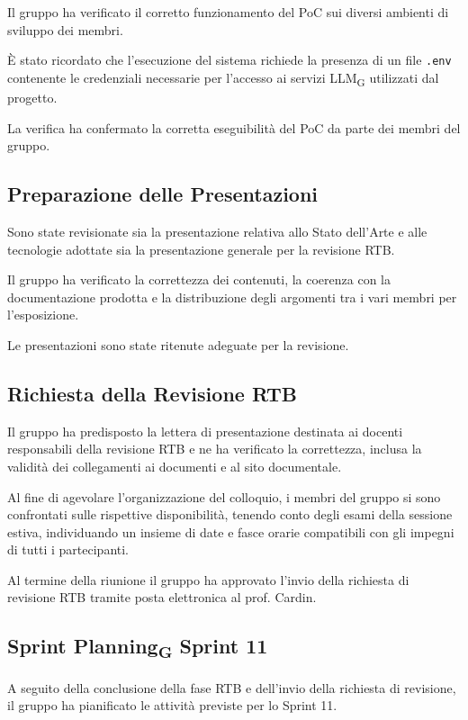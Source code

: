 Il gruppo ha verificato il corretto funzionamento del PoC sui diversi ambienti di sviluppo dei membri.

È stato ricordato che l'esecuzione del sistema richiede la presenza di un file \texttt{.env} contenente le credenziali necessarie per l'accesso ai servizi LLM\textsubscript{G} utilizzati dal progetto.

La verifica ha confermato la corretta eseguibilità del PoC da parte dei membri del gruppo.

\subsection{Preparazione delle Presentazioni}

Sono state revisionate sia la presentazione relativa allo Stato dell'Arte e alle tecnologie adottate sia la presentazione generale per la revisione RTB.

Il gruppo ha verificato la correttezza dei contenuti, la coerenza con la documentazione prodotta e la distribuzione degli argomenti tra i vari membri per l'esposizione.

Le presentazioni sono state ritenute adeguate per la revisione.

\subsection{Richiesta della Revisione RTB}

Il gruppo ha predisposto la lettera di presentazione destinata ai docenti responsabili della revisione RTB e ne ha verificato la correttezza, inclusa la validità dei collegamenti ai documenti e al sito documentale.

Al fine di agevolare l'organizzazione del colloquio, i membri del gruppo si sono confrontati sulle rispettive disponibilità, tenendo conto degli esami della sessione estiva, individuando un insieme di date e fasce orarie compatibili con gli impegni di tutti i partecipanti.

Al termine della riunione il gruppo ha approvato l'invio della richiesta di revisione RTB tramite posta elettronica al prof. Cardin.

\subsection{Sprint Planning\textsubscript{G} Sprint 11}

A seguito della conclusione della fase RTB e dell'invio della richiesta di revisione, il gruppo ha pianificato le attività previste per lo Sprint 11.

